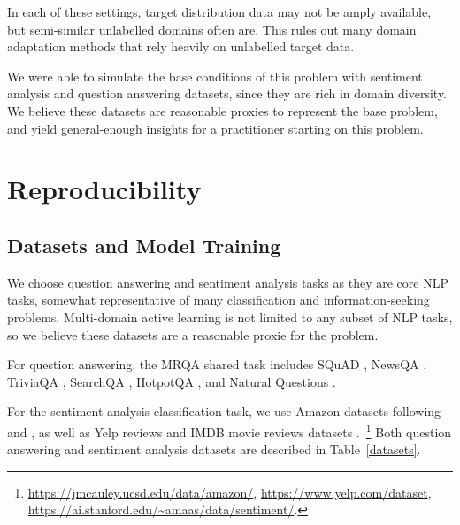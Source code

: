 In each of these settings, target distribution data may not be amply available, but semi-similar unlabelled domains often are. 
This rules out many domain adaptation methods that rely heavily on unlabelled target data.

We were able to simulate the base conditions of this problem with sentiment analysis and question answering datasets, since they are rich in domain diversity. 
We believe these datasets are reasonable proxies to represent the base problem, and yield general-enough insights for a practitioner starting on this problem.


\section{Reproducibility}
\label{sec:appendix-expdesign}

\subsection{Datasets and Model Training}

We choose question answering and sentiment analysis tasks as they are core NLP tasks, somewhat representative of many classification and information-seeking problems.
Multi-domain active learning is not limited to any subset of NLP tasks, so we believe these datasets are a reasonable proxie for the problem.

For question answering, the MRQA shared task \citep{fisch2019mrqa} includes SQuAD \citep{rajpurkar2016squad}, NewsQA \citep{trischler2016newsqa}, TriviaQA \citep{joshi2017triviaqa}, SearchQA \citep{dunn2017searchqa}, HotpotQA \citep{yang2018hotpotqa}, and Natural Questions \citep{kwiatkowski2019natural}.

For the sentiment analysis classification task, we use Amazon datasets following \citep{blitzer-etal-2007-biographies} and \citep{ruder2018strong}, as well as Yelp reviews \citep{asghar2016yelp} and IMDB movie reviews datasets \citep{maas-EtAl:2011:ACL-HLT2011}.~\footnote{\url{https://jmcauley.ucsd.edu/data/amazon/}, \url{https://www.yelp.com/dataset}, \url{https://ai.stanford.edu/~amaas/data/sentiment/}.}
Both question answering and sentiment analysis datasets are described in Table~\ref{datasets}.

